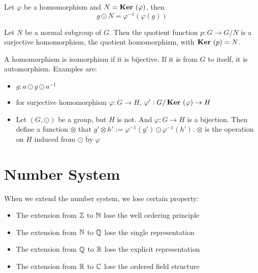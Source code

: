 \begin{theorem}
Let $\varphi$ be a homomorphism and $N = \displaystyle \mathop{\bf Ker\/}~( \varphi )$, then
\begin{equation}
    g \odot N = \varphi^{-1}\left(\varphi(g)\right)
\end{equation}
\end{theorem}

\begin{theorem}
    Let $N$ be a normal subgroup of $G$. Then the quotient function $p: G \rightarrow G/N$ is a surjective homomorphism, the quotient homomorphism, with $\displaystyle \mathop{\bf Ker\/}~( p ) = N$.
\end{theorem}


\begin{definition}
    A homomorphism is isomorphism if it is bijective. If it is from $G$ to itself, it is automorphism. Examples are:
    \begin{itemize}
        \item $g: a \odot g \odot a^{-1}$
        \item for surjective homomorphism $\varphi: G \rightarrow H$, $\varphi' : G/\displaystyle \mathop{\bf Ker\/}~( \varphi ) \rightarrow H$
        \item Let $(G, \odot)$ be a group, but $H$ is not. And $\varphi: G \rightarrow H$ is a bijection. Then define a function $\otimes$ that $g' \otimes h' := \varphi^{-1}(g') \odot \varphi^{-1}(h')$. $\otimes$ is the operation on $H$ induced from $\odot$ by $\varphi$
    \end{itemize}
\end{definition}



\section{Number System}

When we extend the number system, we lose certain property:
\begin{itemize}
    \item The extension from $\mathbb{Z}$ to $\mathbb{N}$ lose the well ordering principle
    \item The extension from $\mathbb{N}$ to $\mathbb{Q}$ lose the single representation
    \item The extension from $\mathbb{Q}$ to $\mathbb{R}$ lose the explicit representation
    \item The extension from $\mathbb{R}$ to $\mathbb{C}$ lose the ordered field structure
\end{itemize}


